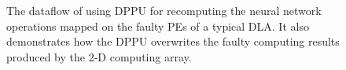 \begin{figure}[tb]
    \setlength{\belowcaptionskip}{0pt}
            \caption{The dataflow of using DPPU for recomputing the neural network operations mapped on the faulty PEs of a typical DLA. It also demonstrates how the DPPU overwrites the faulty computing results produced by the 2-D computing array.}
            \label{fig:pipeline}
            \vspace{-1em}
\end{figure}

